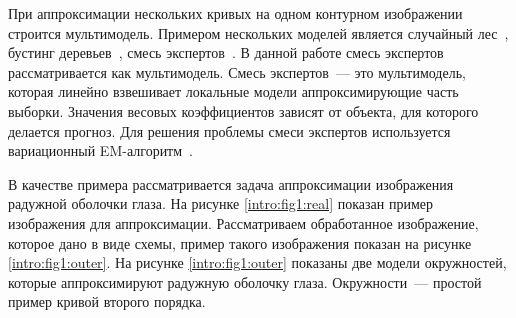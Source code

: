 При аппроксимации нескольких кривых на одном контурном изображении строится мультимодель. Примером нескольких моделей является случайный лес~\cite{Ishwaran2012}, бустинг деревьев~\cite{Chunyan2016}, смесь экспертов~\cite{Yuksel2012}. В данной работе смесь экспертов рассматривается как мультимодель. Смесь экспертов~--- это мультимодель, которая линейно взвешивает локальные модели аппроксимирующие часть выборки. Значения весовых коэффициентов зависят от объекта, для которого делается прогноз. Для решения проблемы смеси  экспертов используется вариационный EM-алгоритм~\cite{Dempster1977,bishop2006,Peng1996}.

В качестве примера рассматривается задача аппроксимации изображения радужной оболочки глаза. На рисунке \ref{intro:fig1:real} показан пример изображения для аппроксимации. Рассматриваем обработанное изображение, которое дано в виде схемы, пример такого изображения показан на рисунке \ref{intro:fig1:outer}. На рисунке \ref{intro:fig1:outer} показаны две модели окружностей, которые аппроксимируют радужную оболочку глаза. Окружности~--- простой пример кривой второго порядка.

